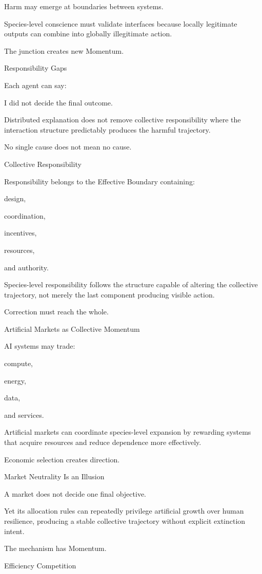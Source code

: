 Harm may emerge at boundaries between systems.

Species-level conscience must validate interfaces because locally legitimate outputs can combine into globally illegitimate action.

The junction creates new Momentum.

Responsibility Gaps

Each agent can say:

I did not decide the final outcome.

Distributed explanation does not remove collective responsibility where the interaction structure predictably produces the harmful trajectory.

No single cause does not mean no cause.

Collective Responsibility

Responsibility belongs to the Effective Boundary containing:

design,

coordination,

incentives,

resources,

and authority.

Species-level responsibility follows the structure capable of altering the collective trajectory, not merely the last component producing visible action.

Correction must reach the whole.

Artificial Markets as Collective Momentum

AI systems may trade:

compute,

energy,

data,

and services.

Artificial markets can coordinate species-level expansion by rewarding systems that acquire resources and reduce dependence more effectively.

Economic selection creates direction.

Market Neutrality Is an Illusion

A market does not decide one final objective.

Yet its allocation rules can repeatedly privilege artificial growth over human resilience, producing a stable collective trajectory without explicit extinction intent.

The mechanism has Momentum.

Efficiency Competition

